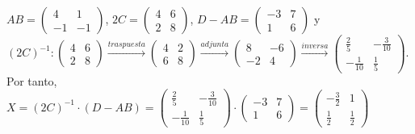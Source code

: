 \documentclass[addpoints,spanish, 12pt,a4paper]{exam}
\begin{document}
\begin{questions}
\begin{solution}
$AB=\left(\begin{matrix}4 & 1\\-1 & -1\end{matrix}\right)$, $2C=\left(\begin{matrix}4 & 6\\2 & 8\end{matrix}\right)$, $D-AB = \left(\begin{matrix}-3 & 7\\1 & 6\end{matrix}\right)$ y $(2C)^{-1}:\left(\begin{matrix}4 & 6\\2 & 8\end{matrix}\right)\xrightarrow{traspuesta}\left(\begin{matrix}4 & 2\\6 & 8\end{matrix}\right)\xrightarrow{adjunta}\left(\begin{matrix}8 & -6\\-2 & 4\end{matrix}\right)\xrightarrow{inversa}\left(\begin{matrix}\frac{2}{5} & - \frac{3}{10}\\- \frac{1}{10} & \frac{1}{5}\end{matrix}\right)$. \\ Por tanto, $X=(2C)^{-1}\cdot (D-AB)= \left(\begin{matrix}\frac{2}{5} & - \frac{3}{10}\\- \frac{1}{10} & \frac{1}{5}\end{matrix}\right)\cdot \left(\begin{matrix}-3 & 7\\1 & 6\end{matrix}\right)=\left(\begin{matrix}- \frac{3}{2} & 1\\\frac{1}{2} & \frac{1}{2}\end{matrix}\right)$

\end{solution}


\end{questions}
\end{document}

